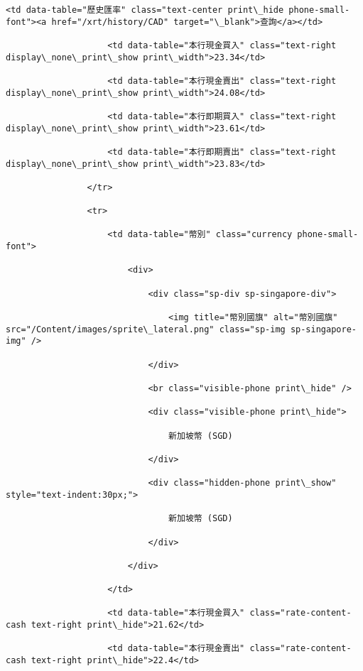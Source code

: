 \documentclass[11pt]{article}
\begin{document}
\begin{Verbatim}[commandchars=\\\{\}]
                    <td data-table="歷史匯率" class="text-center print\_hide phone-small-font"><a href="/xrt/history/CAD" target="\_blank">查詢</a></td>

                    <td data-table="本行現金買入" class="text-right display\_none\_print\_show print\_width">23.34</td>

                    <td data-table="本行現金賣出" class="text-right display\_none\_print\_show print\_width">24.08</td>

                    <td data-table="本行即期買入" class="text-right display\_none\_print\_show print\_width">23.61</td>

                    <td data-table="本行即期賣出" class="text-right display\_none\_print\_show print\_width">23.83</td>

                </tr>

                <tr>

                    <td data-table="幣別" class="currency phone-small-font">

                        <div>

                            <div class="sp-div sp-singapore-div">

                                <img title="幣別國旗" alt="幣別國旗" src="/Content/images/sprite\_lateral.png" class="sp-img sp-singapore-img" />

                            </div>

                            <br class="visible-phone print\_hide" />

                            <div class="visible-phone print\_hide">

                                新加坡幣 (SGD)

                            </div>

                            <div class="hidden-phone print\_show" style="text-indent:30px;">

                                新加坡幣 (SGD)

                            </div>

                        </div>

                    </td>

                    <td data-table="本行現金買入" class="rate-content-cash text-right print\_hide">21.62</td>

                    <td data-table="本行現金賣出" class="rate-content-cash text-right print\_hide">22.4</td>


\end{Verbatim}
\end{document}

